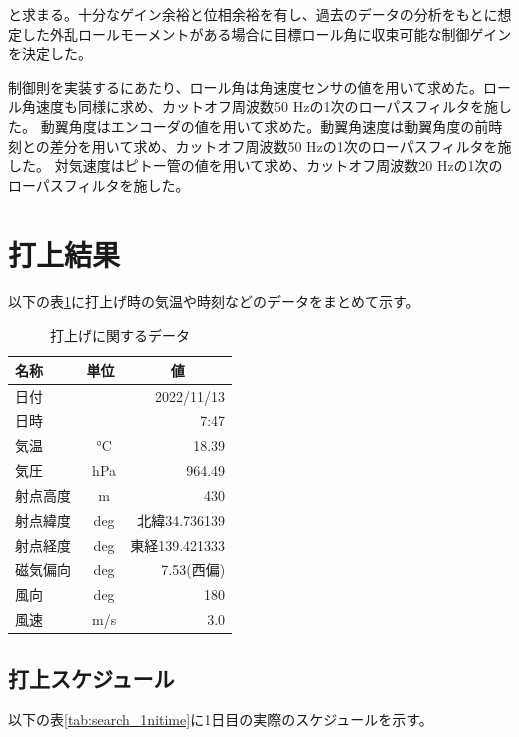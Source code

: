 \documentclass[a4paper,11pt,uplatex]{jsarticle}
\begin{document}
と求まる。十分なゲイン余裕と位相余裕を有し、過去のデータの分析をもとに想定した外乱ロールモーメントがある場合に目標ロール角に収束可能な制御ゲインを決定した。\par
制御則を実装するにあたり、ロール角は角速度センサの値を用いて求めた。ロール角速度も同様に求め、カットオフ周波数50 Hzの1次のローパスフィルタを施した。
動翼角度はエンコーダの値を用いて求めた。動翼角速度は動翼角度の前時刻との差分を用いて求め、カットオフ周波数50 Hzの1次のローパスフィルタを施した。
対気速度はピトー管の値を用いて求め、カットオフ周波数20 Hzの1次のローパスフィルタを施した。

\newpage
\section{打上結果}
以下の表\ref{tab:utiage_shogen}に打上げ時の気温や時刻などのデータをまとめて示す。
\begin{table}[H]
	\centering
	\caption{打上げに関するデータ}
	\label{tab:utiage_shogen}
	\begin{tabular}{lcr}
		\hline
		名称   & 単位                    & \multicolumn{1}{c}{値} \\
		\hline
		日付   &                       & 2022/11/13            \\
		日時   &                       & 7:47                  \\
		気温   & \SI{}{\degreeCelsius} & 18.39                 \\
		気圧   & \SI{}{hPa}            & 964.49                \\
		射点高度 & \SI{}{m}              & 430                   \\
		射点緯度 & \SI{}{deg}            & 北緯34.736139           \\
		射点経度 & \SI{}{deg}            & 東経139.421333          \\
		磁気偏向 & \SI{}{deg}            & 7.53(西偏)              \\
		風向   & \SI{}{deg}            & 180                   \\
		風速   & \SI{}{m/s}            & 3.0                   \\
		\hline
	\end{tabular}
\end{table}

\subsection{打上スケジュール}
以下の表\ref{tab:search_1nitime}に1日目の実際のスケジュールを示す。
\end{document}
